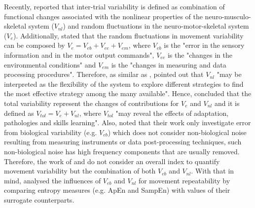 Recently, \cite{preatoni2007, preatoni2010, preatoni2013} reported 
that inter-trial variability is defined as combination of functional changes 
associated with the nonlinear properties of the neuro-musculo-skeletal 
system ($V_{nl}$) and random fluctuations in the neuro-motor-skeletal 
system ($V_e$).
Additionally, \citealt[p. 72]{preatoni2013} stated that the random fluctuations 
in movement variability can be composed by $V_{e}=V_{eb}+V_{ee}+V_{em}$,
where $V_{eb}$ is the "error in the sensory information and in the motor 
output commands",
$V_{ee}$ is the "changes in the environmental conditions" and 
$V_{em}$ is the "changes in measuring and data processing procedures".
Therefore, as similar as \cite{hatze1986}, \citealt[p. 77]{preatoni2013} 
pointed out that $V_{nl}$ "may be interpreted as the flexibility of the 
system to explore different strategies to find the most effective 
strategy among the many available".
Hence, \citealt[p. 1328]{preatoni2010} concluded that the total variability 
represent the changes of contributions for $V_e$ and $V_{nl}$ 
and it is defined as $V_{tol}=V_e+V_{nl}$, where $V_{tol}$ 
"may reveal the effects of adaptation, pathologies and skills learning".
Also, \cite{preatoni2013} noted that their work only investigate error from 
biological variability (e.g. $V_{eb}$) which does not consider 
non-biological noise resulting from measuring instruments or 
data post-processing techniques, such 
non-biological noise has high frequency components that are usually removed.
Therefore, the work of \cite{preatoni2010} and \cite{preatoni2013} 
do not consider an overall index to quantify movement variability but 
the combination of both $V_{eb}$ and $V_{nl}$. 
With that in mind, \cite{preatoni2007} analysed the influences of 
$V_{eb}$ and $V_{nl}$ for movement repeatability by comparing entropy measures 
(e.g. ApEn and SampEn) with values of their surrogate counterparts.


